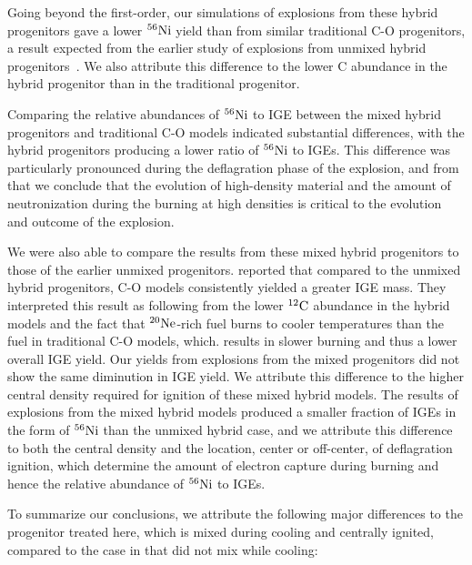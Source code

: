 \documentclass[preprint2]{aastex63}
\newcommand{\C}[1]{\ensuremath{{}^{#1}{\rm C}}}
\newcommand{\Ne}[1]{\ensuremath{{}^{#1}{\rm Ne}}}
\newcommand{\Ni}[1]{\ensuremath{{}^{#1}{\rm Ni}}}
\begin{document}
Going beyond the first-order, our simulations of explosions from
these hybrid progenitors gave a lower \Ni{56} yield than from
similar traditional C-O progenitors, a result expected from
the earlier study of explosions from unmixed hybrid 
progenitors~\citep{willcoxetal2016}. We also attribute this 
difference to the lower C abundance in the hybrid progenitor than
in the traditional progenitor. 

Comparing the relative abundances of \Ni{56} to IGE between the
mixed hybrid progenitors and traditional C-O models indicated
substantial differences, with the hybrid progenitors producing
a lower ratio of \Ni{56} to IGEs. This difference was particularly
pronounced during the deflagration phase of the explosion, and 
from that we conclude that the evolution of high-density material
and the amount of neutronization during the burning at high densities
is critical to the evolution and outcome of the explosion.

We were also able to compare the results from these mixed
hybrid progenitors to those of the earlier unmixed progenitors.
\citet{willcoxetal2016} reported that compared to the unmixed
hybrid progenitors, C-O models consistently yielded a greater IGE mass. 
They interpreted this result as following from 
the lower \C{12} abundance in the hybrid models and the fact that \Ne{20}-rich fuel burns to cooler 
temperatures than the fuel in traditional C-O models, which. results in slower burning and thus a lower
overall IGE yield. Our yields from explosions from the mixed progenitors did not
show the same diminution in IGE yield. We attribute this difference to the higher
central density required for ignition of these mixed hybrid models.
The results of explosions from the mixed hybrid models 
produced a smaller fraction of IGEs in the form of \Ni{56} than the unmixed hybrid case, 
and we attribute this difference 
to both the central density and the location, center or off-center, of deflagration ignition,
which determine the amount of electron capture during burning and hence the relative abundance
of \Ni{56} to IGEs.

To summarize our conclusions, we attribute the following major differences to the progenitor treated here, 
which is mixed during cooling and centrally ignited, compared to the case in \citet{willcoxetal2016} 
that did not mix while cooling:
\end{document}

